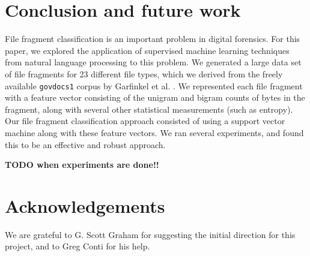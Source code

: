 \documentclass[letter,11pt]{article}
\begin{document}
\section{Conclusion and future work}
\label{Section:ConclusionAndFutureWork}
File fragment classification is an important problem in digital forensics. For this paper, we explored the application of supervised machine learning techniques from natural language processing to this problem. We generated a large data set of file fragments for 23 different file types, which we derived from the freely available \texttt{govdocs1} corpus by Garfinkel et al. \cite{Garfinkel09}. We represented each file fragment with a feature vector consisting of the unigram and bigram counts of bytes in the fragment, along with several other statistical measurements (such as entropy). Our file fragment classification approach consisted of using a support vector machine along with these feature vectors. We ran several experiments, and found this to be an effective and robust approach.

\textbf{TODO when experiments are done!!}

\section*{Acknowledgements}
We are grateful to G. Scott Graham for suggesting the initial direction for this project, and to Greg Conti for his help.


\newpage


\end{document}
